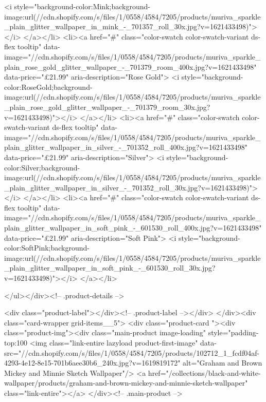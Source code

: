 {{{{{{{              <i style="background-color:Mink;background-image:url(//cdn.shopify.com/s/files/1/0558/4584/7205/products/muriva_sparkle_plain_glitter_wallpaper_in_mink_-_701357_roll_30x.jpg?v=1621433498)"></i>
            </a></li>
<li><a href="#" class="color-swatch color-swatch-variant ds-flex tooltip" data-image="//cdn.shopify.com/s/files/1/0558/4584/7205/products/muriva_sparkle_plain_rose_gold_glitter_wallpaper_-_701379_room_400x.jpg?v=1621433498" data-price="£21.99" aria-description="Rose Gold">
              <i style="background-color:RoseGold;background-image:url(//cdn.shopify.com/s/files/1/0558/4584/7205/products/muriva_sparkle_plain_rose_gold_glitter_wallpaper_-_701379_room_30x.jpg?v=1621433498)"></i>
            </a></li>
<li><a href="#" class="color-swatch color-swatch-variant ds-flex tooltip" data-image="//cdn.shopify.com/s/files/1/0558/4584/7205/products/muriva_sparkle_plain_glitter_wallpaper_in_silver_-_701352_roll_400x.jpg?v=1621433498" data-price="£21.99" aria-description="Silver">
              <i style="background-color:Silver;background-image:url(//cdn.shopify.com/s/files/1/0558/4584/7205/products/muriva_sparkle_plain_glitter_wallpaper_in_silver_-_701352_roll_30x.jpg?v=1621433498)"></i>
            </a></li>
<li><a href="#" class="color-swatch color-swatch-variant ds-flex tooltip" data-image="//cdn.shopify.com/s/files/1/0558/4584/7205/products/muriva_sparkle_plain_glitter_wallpaper_in_soft_pink_-_601530_roll_400x.jpg?v=1621433498" data-price="£21.99" aria-description="Soft Pink">
              <i style="background-color:SoftPink;background-image:url(//cdn.shopify.com/s/files/1/0558/4584/7205/products/muriva_sparkle_plain_glitter_wallpaper_in_soft_pink_-_601530_roll_30x.jpg?v=1621433498)"></i>
            </a></li>

      </ul></div><!-- .product-details -->

<div class="product-label"></div><!-- .product-label --></div>
          </div><div class="card-wrapper grid-items__5">
            <div class="product-card "><div class="product-img"><div class="main-product image-loading" style="padding-top:100%
      <img class="link-entire lazyload product-first-image" data-src="//cdn.shopify.com/s/files/1/0558/4584/7205/products/102712_1_fcdf04af-4293-4e12-8e15-701b6aee30b6_240x.jpg?v=1619819172" alt="Graham and Brown Mickey and Minnie Sketch Wallpaper"/>
      <a href="/collections/black-and-white-wallpaper/products/graham-and-brown-mickey-and-minnie-sketch-wallpaper" class="link-entire"></a>
    </div><!-- .main-product -->
  
}}}}}}}
